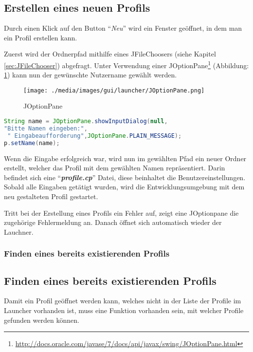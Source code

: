 	\subsection{Erstellen eines neuen Profils}
\fi
Durch einen Klick auf den Button "`\textit{Neu}"' wird ein Fenster geöffnet, in dem man ein Profil erstellen kann.  

Zuerst wird der Ordnerpfad mithilfe eines JFileChoosers (siehe Kapitel \ref{sec:JFileChooser}) abgefragt. Unter Verwendung einer JOptionPane\footnote{\url{http://docs.oracle.com/javase/7/docs/api/javax/swing/JOptionPane.html}}  (Abbildung: \ref{fig:JOptionPane}) kann nun der gewünschte Nutzername gewählt werden.
\begin{figure}[h] 
   \centering
     \texttt{[image: ./media/images/gui/launcher/JOptionPane.png]}
  \caption{JOptionPane}
  \label{fig:JOptionPane}
\end{figure}

\begin{lstlisting}[language=JAVA]
String name = JOptionPane.showInputDialog(null,
"Bitte Namen eingeben:",
 " Eingabeaufforderung",JOptionPane.PLAIN_MESSAGE);
p.setName(name);
\end{lstlisting}

Wenn die Eingabe erfolgreich war, wird nun im gewählten Pfad ein neuer Ordner erstellt, welcher das Profil mit dem gewählten Namen repräsentiert. Darin befindet sich eine "`\textit{\textbf{profile.cp}}"' Datei, diese beinhaltet die Benutzereinstellungen. Sobald alle Eingaben getätigt wurden, wird die Entwicklungsumgebung mit dem neu gestalteten Profil gestartet.

Tritt bei der Erstellung eines Profils ein Fehler auf, zeigt eine JOptionpane die zugehörige Fehlermeldung an. Danach öffnet sich automatisch wieder der Lauchner. 

\iffabian
	\subsubsection*{Finden eines bereits existierenden Profils}
\else
	\subsection{Finden eines bereits existierenden Profils}
\fi
Damit ein Profil geöffnet werden kann, welches nicht in der Liste der Profile im Launcher vorhanden ist, muss eine Funktion vorhanden sein, mit welcher Profile gefunden werden können.

